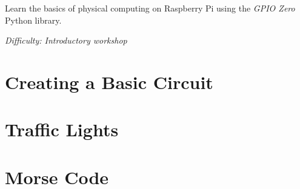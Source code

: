 %
%
%

\newif\ifprint
\printtrue



\newcommand{\workshopTitle}{Workshop 15: GPIO Zero}

\newcommand{\workshopAuthor}{Written by Jack Kelly}



	
	
	Learn the basics of physical computing on Raspberry Pi using the \textit{GPIO Zero} Python library.
	
	\textit{Difficulty: Introductory workshop}
	
	\ifprint
		\renewcommand{\baselinestretch}{0.75}\normalsize
		\tableofcontents
		\renewcommand{\baselinestretch}{1.0}\normalsize
	\else
		\tableofcontents
	\fi
	
	
	
	\clearpage
	
	\section{Creating a Basic Circuit}
	\webclearpage
	
	\section{Traffic Lights}
	\webclearpage
	
	\section{Morse Code}
	\clearpage	
	
	\begin{appendices}
		
		\webclearpage
		
		
	\end{appendices}

